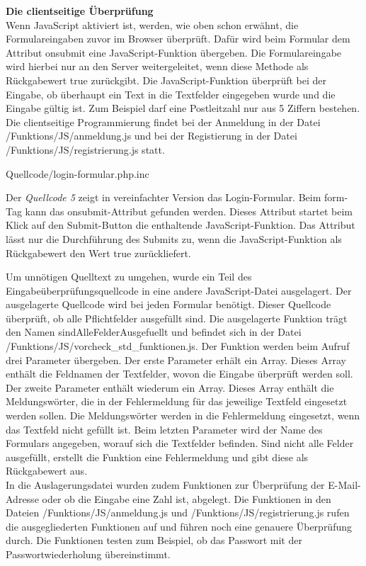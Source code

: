 \textbf{Die clientseitige Überprüfung}\\
Wenn JavaScript aktiviert ist, werden, wie oben schon erwähnt, die Formulareingaben zuvor im Browser überprüft. Dafür wird beim Formular dem Attribut \glqq onsubmit\grqq{} eine JavaScript-Funktion übergeben. Die Formulareingabe wird hierbei nur an den Server weitergeleitet, wenn diese Methode als Rückgabewert \glqq true\grqq{} zurückgibt. Die JavaScript-Funktion überprüft bei der Eingabe, ob überhaupt ein Text in die Textfelder eingegeben wurde und die Eingabe gültig ist. Zum Beispiel darf eine Postleitzahl nur aus 5 Ziffern bestehen. Die clientseitige Programmierung findet bei der Anmeldung in der Datei \glqq /Funktions/JS/anmeldung.js\grqq{} und bei der Registierung in der Datei \glqq /Funktions/JS/registrierung.js\grqq{} statt.

\newpage
\begin{center}
	\begin{lstinputlisting}[language=HTML, caption={Login-Formular (vereinfacht)}]
		{Quellcode/login-formular.php.inc}
	\end{lstinputlisting}
\end{center}

Der \textit{Quellcode 5} zeigt in vereinfachter Version das Login-Formular. Beim \glqq form\grqq{}-Tag kann das \glqq onsubmit\grqq{}-Attribut gefunden werden. Dieses Attribut startet beim Klick auf den Submit-Button die enthaltende JavaScript-Funktion. Das Attribut lässt nur die Durchführung des Submits zu, wenn die JavaScript-Funktion als Rückgabewert den Wert \glqq true\grqq{} zurückliefert.

Um unnötigen Quelltext zu umgehen, wurde ein Teil des Eingabeüberprüfungsquellcode in eine andere JavaScript-Datei ausgelagert. Der ausgelagerte Quellcode wird bei jeden Formular benötigt. Dieser Quellcode überprüft, ob alle Pflichtfelder ausgefüllt sind. Die ausgelagerte Funktion trägt den Namen \glqq sindAlleFelderAusgefuellt\grqq{} und befindet sich in der Datei \glqq /Funktions/JS/vorcheck\_std\_funktionen.js\grqq{}. Der Funktion werden beim Aufruf drei Parameter übergeben. Der erste Parameter erhält ein Array. Dieses Array enthält die Feldnamen der Textfelder, wovon die Eingabe überprüft werden soll. Der zweite Parameter enthält wiederum ein Array. Dieses Array enthält die Meldungswörter, die in der Fehlermeldung für das jeweilige Textfeld eingesetzt werden sollen. Die Meldungswörter werden in die Fehlermeldung eingesetzt, wenn das Textfeld nicht gefüllt ist. Beim letzten Parameter wird der Name des Formulars angegeben, worauf sich die Textfelder befinden. Sind nicht alle Felder ausgefüllt, erstellt die Funktion eine Fehlermeldung und gibt diese als Rückgabewert aus.\\
In die Auslagerungsdatei wurden zudem Funktionen zur Überprüfung der E-Mail-Adresse oder ob die Eingabe eine Zahl ist, abgelegt. Die Funktionen in den Dateien \glqq /Funktions/JS/anmeldung.js\grqq{} und  
\glqq /Funktions/JS/registrierung.js\grqq{} rufen die ausgegliederten Funktionen auf und führen noch eine genauere Überprüfung durch. Die Funktionen testen zum Beispiel, ob das Passwort mit der Passwortwiederholung übereinstimmt.\\

